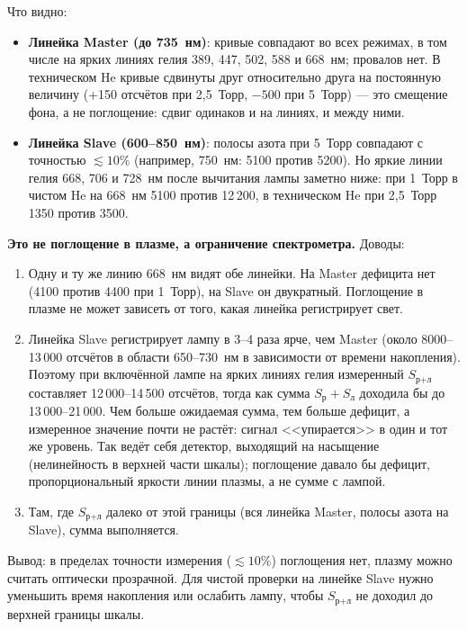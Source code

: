 \documentclass[12pt,a4paper]{article}
\begin{document}
Что видно:
\begin{itemize}
  \item \textbf{Линейка Master (до 735~нм)}: кривые совпадают во всех
        режимах, в том числе на ярких линиях гелия 389, 447, 502, 588 и
        668~нм; провалов нет. В техническом He кривые сдвинуты друг
        относительно друга на постоянную величину (+150 отсчётов при
        2,5~Торр, $-500$ при 5~Торр) --- это смещение фона, а не поглощение:
        сдвиг одинаков и на линиях, и между ними.
  \item \textbf{Линейка Slave (600--850~нм)}: полосы азота при 5~Торр
        совпадают с точностью $\lesssim 10\%$ (например, 750~нм: 5100
        против 5200). Но яркие линии гелия 668, 706 и 728~нм после вычитания
        лампы заметно ниже: при 1~Торр в чистом He на 668~нм 5100
        против 12\,200, в техническом He при 2,5~Торр 1350 против 3500.
\end{itemize}

\textbf{Это не поглощение в плазме, а ограничение спектрометра.}
Доводы:
\begin{enumerate}
  \item Одну и ту же линию 668~нм видят обе линейки. На Master
        дефицита нет (4100 против 4400 при 1~Торр), на Slave он
        двукратный. Поглощение в плазме не может зависеть от того, какая
        линейка регистрирует свет.
  \item Линейка Slave регистрирует лампу в 3--4 раза ярче, чем Master
        (около 8000--13\,000 отсчётов в области 650--730~нм в
        зависимости от времени накопления). Поэтому при включённой
        лампе на ярких линиях гелия измеренный $S_\text{р+л}$ составляет
        12\,000--14\,500 отсчётов, тогда как сумма $S_\text{р}+S_\text{л}$
        доходила бы до 13\,000--21\,000. Чем больше ожидаемая сумма, тем
        больше дефицит, а измеренное значение почти не растёт: сигнал
        <<упирается>> в один и тот же уровень. Так ведёт себя детектор,
        выходящий на насыщение (нелинейность в верхней части шкалы);
        поглощение давало бы дефицит, пропорциональный яркости линии
        плазмы, а не сумме с лампой.
  \item Там, где $S_\text{р+л}$ далеко от этой границы (вся линейка
        Master, полосы азота на Slave), сумма выполняется.
\end{enumerate}
Вывод: в пределах точности измерения ($\lesssim 10\%$) поглощения нет,
плазму можно считать оптически прозрачной. Для чистой проверки на
линейке Slave нужно уменьшить время накопления или ослабить лампу, чтобы
$S_\text{р+л}$ не доходил до верхней границы шкалы.
\end{document}
